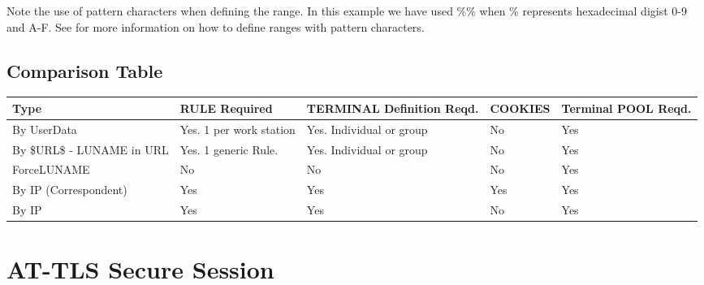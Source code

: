 \documentclass[letterpaper,10pt,english]{sphinxmanual}
\begin{document}
Note the use of pattern characters when defining the range. In this example we have used \%\% when \% represents hexadecimal digist 0-9 and A-F. See {\hyperref[\detokenize{connectivity_guide:v461cn-patterncharacters}]{}} for more information on how to define ranges with pattern characters.


\newpage

\ignorespaces 

\section{Comparison Table}
\label{\detokenize{connectivity_guide:comparison-table}}\label{\detokenize{connectivity_guide:index-155}}

\begin{savenotes}\sphinxattablestart
\centering
\begin{tabulary}{\linewidth}[t]{|T|T|T|T|T|}
\hline
\sphinxstyletheadfamily 
Type
&\sphinxstyletheadfamily 
RULE Required
&\sphinxstyletheadfamily 
TERMINAL Definition Reqd.
&\sphinxstyletheadfamily 
COOKIES
&\sphinxstyletheadfamily 
Terminal POOL Reqd.
\\
\hline
By UserData
&
Yes. 1 per work station
&
Yes. Individual or group
&
No
&
Yes
\\
\hline
By \$URL\$ - LUNAME in URL
&
Yes. 1 generic Rule.
&
Yes. Individual or group
&
No
&
Yes
\\
\hline
ForceLUNAME
&
No
&
No
&
No
&
Yes
\\
\hline
By IP (Correspondent)
&
Yes
&
Yes
&
Yes
&
Yes
\\
\hline
By IP
&
Yes
&
Yes
&
No
&
Yes
\\
\hline
\end{tabulary}
\par
\sphinxattableend\end{savenotes}

\ignorespaces 

\chapter{AT-TLS Secure Session}
\label{\detokenize{connectivity_guide:at-tls-secure-session}}\label{\detokenize{connectivity_guide:index-156}}
\end{document}

